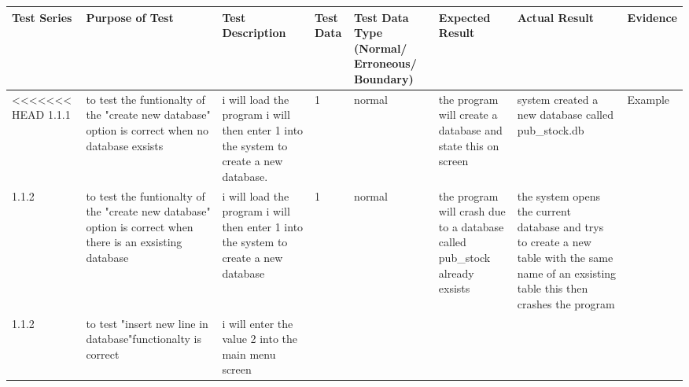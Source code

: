 \begin{landscape}
\begin{center}
    \begin{longtable}{|p{1.5cm}|p{2.5cm}|p{2.5cm}|p{2cm}|p{2cm}|p{2cm}|p{2cm}|p{2cm}|}
        \hline
        \textbf{Test Series} & \textbf{Purpose of Test} & \textbf{Test Description} & \textbf{Test Data} & \textbf{Test Data Type (Normal/ Erroneous/ Boundary)} & \textbf{Expected Result} & \textbf{Actual Result} & \textbf{Evidence}\\ \hline
<<<<<<< HEAD
       1.1.1 & to test the funtionalty of the "create new database" option is correct when no database exsists & i will load the program i will then enter 1 into the system to create a new database. & 1 & normal & the program will create a database and state this on screen &system created a new database called pub_stock.db & Example \\ \hline
1.1.2 & to test the funtionalty of the "create new database" option is correct when there is an exsisting database  &  i will load the program i will then enter 1 into the system to create a new database & 1 & normal &the program will crash due to a database called pub_stock already exsists & the system opens the current database and trys to create a new table with the same name of an exsisting table this then crashes the program & \\ \hline
1.1.2 & to test "insert new line in database"functionalty is correct & i will enter the value 2 into the main menu screen


\end{longtable}
\end{center}
\end{landscape}
